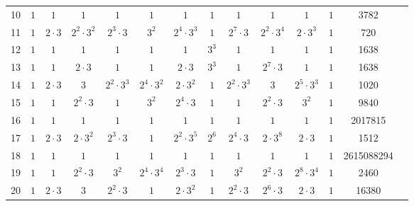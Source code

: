 {\begin{table}
\begin{center}
\begin{adjustbox}{max width=\textwidth}
\begin{tabular}{|c|cccccccccccc|c|}
10 &$1$ &$1$ &$1$ &$1$ &$1$ &$1$ &$1$ &$1$ &$1$ &$1$ &$1$ &3782\\
11 &$1$ &$2\cdot 3$ &$2^{2}\cdot 3^{2}$ &$2^{3}\cdot 3$ &$3^{2}$ &$2^{4}\cdot 3^{3}$ &$1$ &$2^{7}\cdot 3$ &$2^{2}\cdot 3^{4}$ &$2\cdot 3^{3}$ &$1$ &720\\
12 &$1$ &$1$ &$1$ &$1$ &$1$ &$1$ &$3^{3}$ &$1$ &$1$ &$1$ &$1$ &1638\\
13 &$1$ &$1$ &$2\cdot 3$ &$1$ &$1$ &$2\cdot 3$ &$3^{3}$ &$1$ &$2^{7}\cdot 3$ &$1$ &$1$ &1638\\
14 &$1$ &$2\cdot 3$ &$3$ &$2^{2}\cdot 3^{3}$ &$2^{4}\cdot 3^{2}$ &$2\cdot 3^{2}$ &$1$ &$2^{2}\cdot 3^{3}$ &$3$ &$2^{5}\cdot 3^{3}$ &$1$ &1020\\
15 &$1$ &$1$ &$2^{2}\cdot 3$ &$1$ &$3^{2}$ &$2^{4}\cdot 3$ &$1$ &$1$ &$2^{2}\cdot 3$ &$3^{2}$ &$1$ &9840\\
16 &$1$ &$1$ &$1$ &$1$ &$1$ &$1$ &$1$ &$1$ &$1$ &$1$ &$1$ &2017815\\
17 &$1$ &$2\cdot 3$ &$2\cdot 3^{2}$ &$2^{3}\cdot 3$ &$1$ &$2^{2}\cdot 3^{5}$ &$2^{6}$ &$2^{4}\cdot 3$ &$2\cdot 3^{8}$ &$2\cdot 3$ &$1$ &1512\\
18 &$1$ &$1$ &$1$ &$1$ &$1$ &$1$ &$1$ &$1$ &$1$ &$1$ &$1$ &2615088294\\
19 &$1$ &$1$ &$2^{2}\cdot 3$ &$3^{2}$ &$2^{4}\cdot 3^{4}$ &$2^{3}\cdot 3$ &$1$ &$3^{2}$ &$2^{2}\cdot 3$ &$2^{8}\cdot 3^{4}$ &$1$ &2460\\
20 &$1$ &$2\cdot 3$ &$3$ &$2^{2}\cdot 3$ &$1$ &$2\cdot 3^{2}$ &$1$ &$2^{2}\cdot 3$ &$2^{6}\cdot 3$ &$2\cdot 3$ &$1$ &16380\\

\end{tabular}
\end{adjustbox}
\end{center}
\end{table}}
